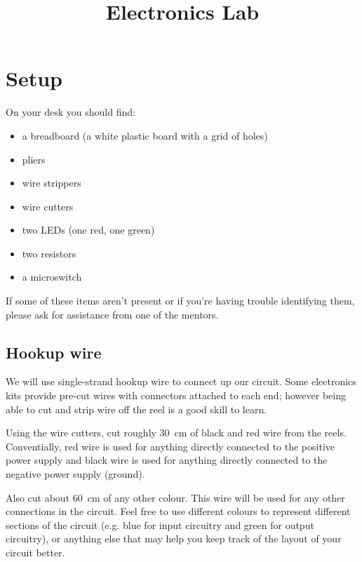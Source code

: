 \documentclass{article}
\title{Electronics Lab}
\begin{document}
\listoftodos
\newpage

\maketitle


\section{Setup}

On your desk you should find:

\begin{itemize}
\item a breadboard (a white plastic board with a grid of holes)
\item pliers
\item wire strippers
\item wire cutters
\item two LEDs (one red, one green)
\item two resistors
\item a microswitch
\end{itemize}


If some of these items aren't present or if you're having trouble identifying
them, please ask for assistance from one of the mentors.

\subsection{Hookup wire}

We will use single-strand hookup wire to connect up our circuit. Some
electronics kits provide pre-cut wires with connectors attached to each end;
however being able to cut and strip wire off the reel is a good skill to learn.

Using the wire cutters, cut roughly \SI{30}{\centi\metre} of black and red wire
from the reels. Conventially, red wire is used for anything directly connected
to the positive power supply and black wire is used for anything directly
connected to the negative power supply (ground).

Also cut about \SI{60}{\centi\metre} of any other colour. This wire will be used
for any other connections in the circuit. Feel free to use different colours to
represent different sections of the circuit (e.g. blue for input circuitry and
green for output circuitry), or anything else that may help you keep track of
the layout of your circuit better.
\end{document}
